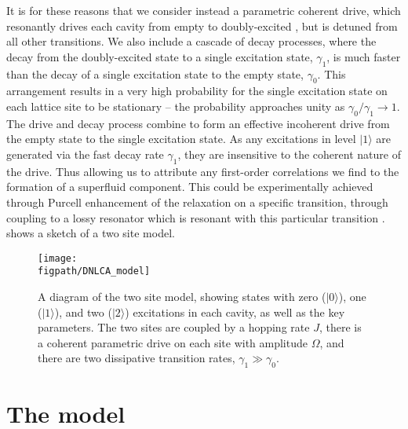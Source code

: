 It is for these reasons that we consider instead a parametric coherent drive, which resonantly drives each cavity from empty to doubly-excited \cite{Ma2017,Savona2017}, but is detuned from all other transitions. We also include a cascade of decay processes, where the decay from the doubly-excited state to a single excitation state, \(\gamma_{1}\), is much faster than the decay of a single excitation state to the empty state, \(\gamma_{0}\). This arrangement results in a very high probability for the single excitation state on each lattice site to be stationary -- the probability approaches unity as \(\gamma_{0}/\gamma_{1} \rightarrow 1\). The drive and decay process combine to form an effective incoherent drive from the empty state to the single excitation state. As any excitations in level \(|1\rangle\) are generated via the fast decay rate \(\gamma_{1}\), they are insensitive to the coherent nature of the drive. Thus allowing us to attribute any first-order correlations we find to the formation of a superfluid component. This could be experimentally achieved through Purcell enhancement \cite{Purcell1946,Fox_Purcell} of the relaxation on a specific transition, through coupling to a lossy resonator which is resonant with this particular transition \cite{Bienfait2016}.  shows a sketch of a two site model.

\begin{figure}[ht!]
\centering 
\texttt{[image: \\figpath/DNLCA\_model]}
\caption{\label{fig:dnlca1-1}A diagram of the two site model, showing states with zero (\(|0\rangle\)), one (\(|1\rangle\)), and two (\(|2\rangle\)) excitations in each cavity, as well as the key parameters. The two sites are coupled by a hopping rate \(J\), there is a coherent parametric drive on each site with amplitude \(\Omega\), and there are two dissipative transition rates, \(\gamma_{1} \gg \gamma_{0}\).}
\end{figure}

\section{The model}

